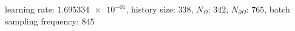 learning rate: $\num[scientific-notation=true]{1.695334e-01}$, history size: $\num[scientific-notation=false]{338}$, $N_{\Omega}$: $\num[scientific-notation=false]{342}$, $N_{\partial\Omega}$: $\num[scientific-notation=false]{765}$, batch sampling frequency: $\num[scientific-notation=false]{845}$